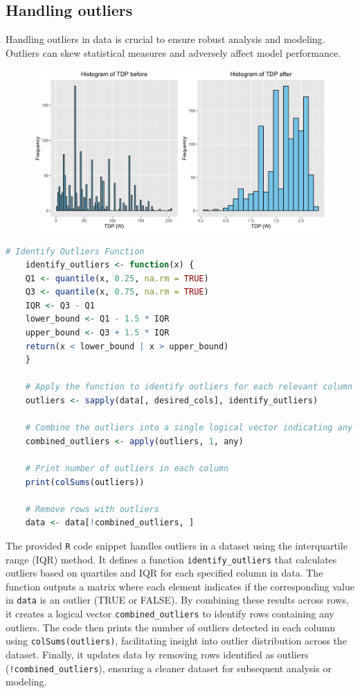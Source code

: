\newpage
\subsection{Handling outliers}
Handling outliers in data is crucial to ensure robust analysis and modeling. Outliers can skew statistical measures and adversely affect model performance.

\begin{figure}[H]
    \begin{center}
    \includegraphics[width=14cm]{graphics/tdp_before_after.png}
    \end{center}
\end{figure}

\begin{lstlisting}[language=R]
    # Identify Outliers Function
    identify_outliers <- function(x) {
    Q1 <- quantile(x, 0.25, na.rm = TRUE)
    Q3 <- quantile(x, 0.75, na.rm = TRUE)
    IQR <- Q3 - Q1
    lower_bound <- Q1 - 1.5 * IQR
    upper_bound <- Q3 + 1.5 * IQR
    return(x < lower_bound | x > upper_bound)
    }

    # Apply the function to identify outliers for each relevant column
    outliers <- sapply(data[, desired_cols], identify_outliers)

    # Combine the outliers into a single logical vector indicating any row with an outlier
    combined_outliers <- apply(outliers, 1, any)

    # Print number of outliers in each column
    print(colSums(outliers))

    # Remove rows with outliers
    data <- data[!combined_outliers, ]
\end{lstlisting}

The provided \texttt{R} code snippet handles outliers in a dataset using the interquartile range (IQR) method. It defines a function \texttt{identify\_outliers} that calculates outliers based on quartiles and IQR for each specified column in data. The function outputs a matrix where each element indicates if the corresponding value in \texttt{data} is an outlier (TRUE or FALSE). By combining these results across rows, it creates a logical vector \texttt{combined\_outliers} to identify rows containing any outliers. The code then prints the number of outliers detected in each column using \texttt{colSums(outliers)}, facilitating insight into outlier distribution across the dataset. Finally, it updates data by removing rows identified as outliers (\texttt{!combined\_outliers}), ensuring a cleaner dataset for subsequent analysis or modeling.


\newpage